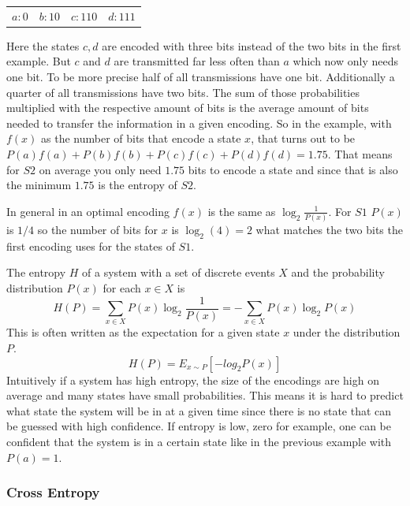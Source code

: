 \begin{center}
    \begin{tabular} {c c c c}
        $a: 0$ & $b: 10$ & $c: 110$ & $d: 111$
    \end{tabular}
\end{center}

Here the states $c, d$ are encoded with three bits instead of the two bits in the first example.
But $c$ and $d$ are transmitted far less often than $a$ which now only needs one bit. To be more precise
half of all transmissions have one bit. Additionally a quarter of all transmissions have two bits. 
The sum of those probabilities multiplied with the respective amount of bits is the average amount of bits
needed to transfer the information in a given encoding. So in the example, with $f(x)$ as the number of
bits that encode a state $x$, that turns out to be $P(a)f(a)+P(b)f(b)+P(c)f(c)+P(d)f(d)=1.75$.
That means for $S2$ on average you only need $1.75$ bits to encode a state and since that is also the
minimum $1.75$ is the entropy of $S2$.

In general in an optimal encoding $f(x)$ is the same as $\log_{2} \frac{1}{P(x)}$. For $S1$ $P(x)$ is $1/4$
so the number of bits for $x$ is $\log_{2} (4)=2$ what matches the two bits the first encoding uses 
for the states of $S1$.

The entropy $H$ of a system with a set of discrete events $X$ and the probability distribution $P(x)$
for each $x\in X$ is
\begin{equation}
    H(P)=\sum_{x\in X} P(x)\log_{2} \frac{1}{P(x)} = -\sum_{x\in X} P(x)\log_{2} P(x)
\end{equation}
This is often written as the expectation for a  given state $x$ under the distribution $P$.
\[ H(P)=E_{x\sim P}[-log_{2}P(x)]\]
Intuitively if a system has high entropy, the size of the encodings are high on average and many states
have small probabilities. This means it is hard to predict what state the system will be in at a given time
since there is no state that can be guessed with high confidence. If entropy is low, zero for example,
one can be confident that the system is in a certain state like in the previous example with $P(a)=1$.


\subsubsection{Cross Entropy}

